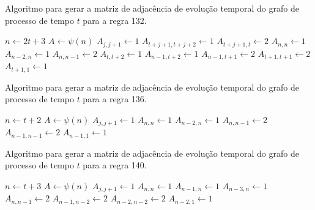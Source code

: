 \documentclass[12pt,a4paper]{article}
\begin{document}
\begin{algorithm}[H]
\caption{Algoritmo para gerar a matriz de adjacência de evolução temporal do
grafo de processo de tempo $t$ para a regra 132.}
\label{alg:r132}
\begin{algorithmic}
\STATE $n \leftarrow 2t+3$
\STATE $A \leftarrow \psi(n)$
        \STATE $A_{j,j+1} \leftarrow 1$
        \STATE $A_{t+j+1,t+j+2} \leftarrow 1$
    \ENDFOR
\ENDIF
{}
    \STATE $A_{t+j+1,t} \leftarrow 2$
\ENDFOR
\STATE $A_{n,n} \leftarrow 1$
\STATE $A_{n-2,n} \leftarrow 1$
\STATE $A_{n,n-1} \leftarrow 2$
\STATE $A_{t,t+2} \leftarrow 1$
\STATE $A_{n-1,t+2} \leftarrow 1$
\STATE $A_{n-1,t+1} \leftarrow 2$
\STATE $A_{t+1,t+1} \leftarrow 2$
\STATE $A_{t+1,1} \leftarrow 1$
\end{algorithmic}
\end{algorithm}

\begin{algorithm}[H]
\caption{Algoritmo para gerar a matriz de adjacência de evolução temporal do
grafo de processo de tempo $t$ para a regra 136.}
\label{alg:r136}
\begin{algorithmic}
\STATE $n \leftarrow t+2$
\STATE $A \leftarrow \psi(n)$
        \STATE $A_{j,j+1} \leftarrow 1$
    \ENDFOR
\ENDIF
\STATE $A_{n,n} \leftarrow 1$
\STATE $A_{n-2,n} \leftarrow 1$
\STATE $A_{n,n-1} \leftarrow 2$
\STATE $A_{n-1,n-1} \leftarrow 2$
\STATE $A_{n-1,1} \leftarrow 1$
\end{algorithmic}
\end{algorithm}

\begin{algorithm}[H]
\caption{Algoritmo para gerar a matriz de adjacência de evolução temporal do
grafo de processo de tempo $t$ para a regra 140.}
\label{alg:r140}
\begin{algorithmic}
\STATE $n \leftarrow t+3$
\STATE $A \leftarrow \psi(n)$
        \STATE $A_{j,j+1} \leftarrow 1$
    \ENDFOR
\ENDIF
\STATE $A_{n,n} \leftarrow 1$
\STATE $A_{n-1,n} \leftarrow 1$
\STATE $A_{n-3,n} \leftarrow 1$
\STATE $A_{n,n-1} \leftarrow 2$
\STATE $A_{n-1,n-2} \leftarrow 2$
\STATE $A_{n-2,n-2} \leftarrow 2$
\STATE $A_{n-2,1} \leftarrow 1$
\end{algorithmic}
\end{algorithm}
\end{document}
